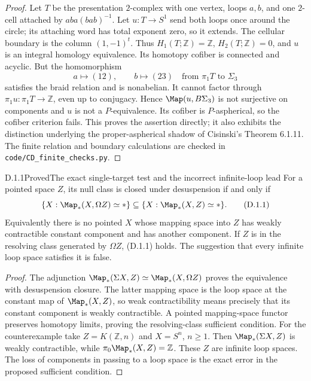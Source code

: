 \begin{proof}
Let $T$ be the presentation $2$-complex with one vertex, loops $a,b$, and one $2$-cell attached by $aba(bab)^{-1}$. Let $u:T\to S^1$ send both loops once around the circle; its attaching word has total exponent zero, so it extends. The cellular boundary is the column $(1,-1)^t$. Thus $H_1(T;\mathbb Z)=\mathbb Z$, $H_2(T;\mathbb Z)=0$, and $u$ is an integral homology equivalence. Its homotopy cofiber is connected and acyclic. But the homomorphism
\[
 a\longmapsto(12),\qquad b\longmapsto(23)
 \quad\text{from }\pi_1T\text{ to }\Sigma_3
\]
satisfies the braid relation and is nonabelian. It cannot factor through $\pi_1u:\pi_1T\to\mathbb Z$, even up to conjugacy. Hence $\Map(u,B\Sigma_3)$ is not surjective on components and $u$ is not a $P$-equivalence. Its cofiber is $P$-aspherical, so the cofiber criterion fails. This proves the assertion directly; it also exhibits the distinction underlying the proper-aspherical shadow of Cisinski's Theorem 6.1.11. The finite relation and boundary calculations are checked in \texttt{code/CD\_finite\_checks.py}.
\end{proof}

\begin{claim}{D.1.1}{Proved}{The exact single-target test and the incorrect infinite-loop lead}
For a pointed space $Z$, its null class is closed under desuspension if and only if
\[
 \{X:\Map_*(X,\Omega Z)\simeq *\}
 \subseteq
 \{X:\Map_*(X,Z)\simeq *\}.                         \tag{D.1.1}
\]
Equivalently there is no pointed $X$ whose mapping space into $Z$ has weakly contractible constant component and has another component. If $Z$ is in the resolving class generated by $\Omega Z$, (D.1.1) holds. The suggestion that every infinite loop space satisfies it is false.
\end{claim}
\begin{proof}
The adjunction $\Map_*(\Sigma X,Z)\simeq\Map_*(X,\Omega Z)$ proves the equivalence with desuspension closure. The latter mapping space is the loop space at the constant map of $\Map_*(X,Z)$, so weak contractibility means precisely that its constant component is weakly contractible. A pointed mapping-space functor preserves homotopy limits, proving the resolving-class sufficient condition. For the counterexample take $Z=K(\mathbb Z,n)$ and $X=S^n$, $n\geq1$. Then $\Map_*(\Sigma X,Z)$ is weakly contractible, while $\pi_0\Map_*(X,Z)=\mathbb Z$. These $Z$ are infinite loop spaces. The loss of components in passing to a loop space is the exact error in the proposed sufficient condition.
\end{proof}

